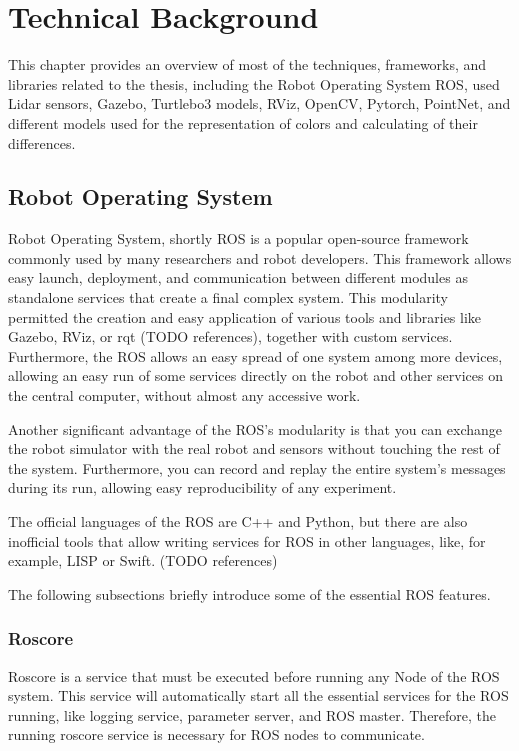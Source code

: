 \chapter{Technical Background}\label{chapter:technicalBackground}

This chapter provides an overview of most of the techniques, frameworks, and libraries related to the thesis, including the Robot Operating System ROS, used Lidar sensors, Gazebo, Turtlebo3 models, RViz, OpenCV, Pytorch, PointNet, and different models used for the representation of colors and calculating of their differences.

\section{Robot Operating System}

Robot Operating System, shortly ROS is a popular open-source framework commonly used by many researchers and robot developers. This framework allows easy launch, deployment, and communication between different modules as standalone services that create a final complex system. This modularity permitted the creation and easy application of various tools and libraries like Gazebo, RViz, or rqt (TODO references), together with custom services. Furthermore, the ROS allows an easy spread of one system among more devices, allowing an easy run of some services directly on the robot and other services on the central computer, without almost any accessive work.\par
Another significant advantage of the ROS's modularity is that you can exchange the robot simulator with the real robot and sensors without touching the rest of the system. Furthermore, you can record and replay the entire system's messages during its run, allowing easy reproducibility of any experiment.\par
The official languages of the ROS are C++ and Python, but there are also inofficial tools that allow writing services for ROS in other languages, like, for example, LISP or Swift. (TODO references)\par
The following subsections briefly introduce some of the essential ROS features.

\subsection*{Roscore}

Roscore is a service that must be executed before running any Node of the ROS system. This service will automatically start all the essential services for the ROS running, like logging service, parameter server, and ROS master. Therefore, the running roscore service is necessary for ROS nodes to communicate.

